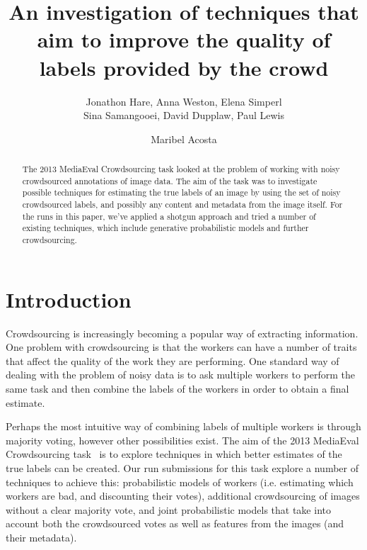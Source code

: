 \documentclass{../acm_proc_article-me11_tweaked}
\begin{document}

\title{An investigation of techniques that aim to improve the quality of labels provided by the crowd}

%
\def\sharedaffiliation{%
\end{tabular}
\begin{tabular}{c}}
%

\author{
	\alignauthor
	Jonathon Hare, Anna Weston, Elena Simperl\\
	Sina Samangooei, David Dupplaw, Paul Lewis\\
	\and
	\alignauthor
	Maribel Acosta\\
}

\maketitle
\begin{abstract}
The 2013 MediaEval Crowdsourcing task looked at the problem of working with noisy crowdsourced annotations of image data. The aim of the task was to investigate possible techniques for estimating the true labels of an image by using the set of noisy crowdsourced labels, and possibly any content and metadata from the image itself. For the runs in this paper, we've applied a shotgun approach and tried a number of existing techniques, which include generative probabilistic models and further crowdsourcing.
\end{abstract}

\section{Introduction}
Crowdsourcing is increasingly becoming a popular way of extracting information. One problem with crowdsourcing is that the workers can have a number of traits that affect the quality of the work they are performing. One standard way of dealing with the problem of noisy data is to ask multiple workers to perform the same task and then combine the labels of the workers in order to obtain a final estimate.

Perhaps the most intuitive way of combining labels of multiple workers is through majority voting, however other possibilities exist. The aim of the 2013 MediaEval Crowdsourcing task~\cite{CS2013} is to explore techniques in which better estimates of the true labels can be created. Our run submissions for this task explore a number of techniques to achieve this: probabilistic models of workers (i.e. estimating which workers are bad, and discounting their votes), additional crowdsourcing of images without a clear majority vote, and joint probabilistic models that take into account both the crowdsourced votes as well as features from the images (and their metadata).
	
\end{document}
